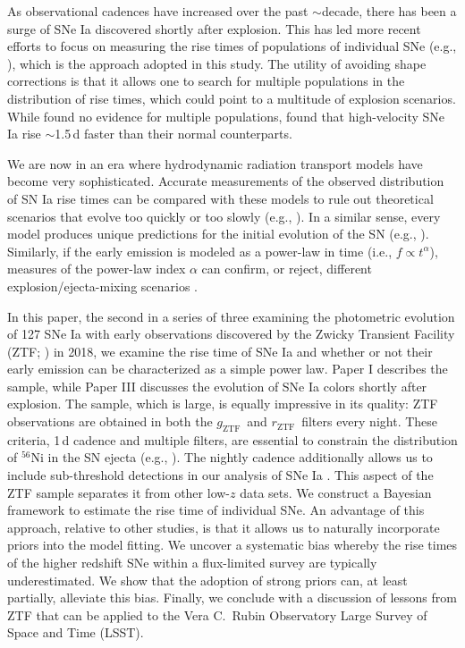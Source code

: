 \documentclass[twocolumn]{aastex63}
\newcommand{\rztf}{$r_\mathrm{ZTF}$}
\newcommand{\gztf}{$g_\mathrm{ZTF}$}
\begin{document}
As observational cadences have increased over the past $\sim$decade, there has
been a surge of SNe Ia discovered shortly after explosion. This has led more
recent efforts to focus on measuring the rise times of populations of
individual SNe (e.g., \citealt{Firth15,Zheng17a,Papadogiannakis19}), which is
the approach adopted in this study. The utility of avoiding shape corrections
is that it allows one to search for multiple populations in the distribution
of rise times, which could point to a multitude of explosion scenarios. While
\citet{Papadogiannakis19} found no evidence for multiple populations,
\citet{Ganeshalingam10} found that high-velocity SNe Ia rise $\sim$1.5\,d
faster than their normal counterparts.

We are now in an era where hydrodynamic radiation transport models have become
very sophisticated. Accurate measurements of the observed distribution of SN
Ia rise times can be compared with these models to rule out theoretical
scenarios that evolve too quickly or too slowly (e.g., \citealt{Magee18}). In
a similar sense, every model produces unique predictions for the initial
evolution of the SN (e.g., \citealt{Dessart14,Noebauer17,Polin19,Magee19}).
Similarly, if the early emission is modeled as a power-law in time (i.e., $f
\propto t^\alpha$), measures of the power-law index $\alpha$ can confirm, or
reject, different explosion/ejecta-mixing scenarios \citet{Magee19}.

In this paper, the second in a series of three examining the photometric
evolution of 127 SNe Ia with early observations discovered by the Zwicky
Transient Facility (ZTF; \citealt{Bellm19,Graham19,Dekany20}) in 2018, we examine the
rise time of SNe Ia and whether or not their early emission can be
characterized as a simple power law. Paper I \citep{Yao19} describes the
sample, while Paper III \citep{Bulla20} discusses the evolution of SNe Ia
colors shortly after explosion. The sample, which is large, is equally
impressive in its quality: ZTF observations are obtained in both the \gztf\
and \rztf\ filters every night. These criteria, 1\,d cadence and multiple
filters, are essential to constrain the distribution of $^{56}$Ni in the SN
ejecta (e.g., \citealt{Magee19}). The nightly cadence additionally allows us
to include sub-threshold detections in our analysis of SNe Ia \citep{Yao19}.
This aspect of the ZTF sample separates it from other low-$z$ data sets. We
construct a Bayesian framework to estimate the rise time of individual SNe. An
advantage of this approach, relative to other studies, is that it allows us to
naturally incorporate priors into the model fitting. We uncover a systematic
bias whereby the rise times of the higher redshift SNe within a flux-limited
survey are typically underestimated. We show that the adoption of strong
priors can, at least partially, alleviate this bias. Finally, we conclude with
a discussion of lessons from ZTF that can be applied to the Vera C.~Rubin
Observatory Large Survey of Space and Time (LSST).
\end{document}
